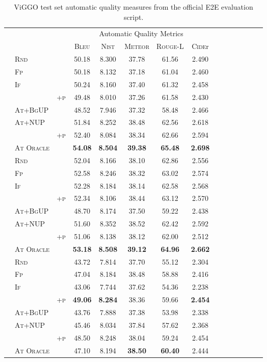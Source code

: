\begin{table*}
\begin{tabular}{lll c c c c  c c c c  c c c c}
 & & &  \multicolumn{5}{c}{Automatic Quality Metrics} \\
\cmidrule(lr){4-8} 
 & & &  \textsc{Bleu} &  \textsc{Nist} &  \textsc{Meteor} & \textsc{Rouge-L} & \textsc{Cide}r \\
\midrule
\parbox[t]{2mm}{}
&\textsc{Rnd} & &50.18&8.300&37.78&61.56&2.490 \\
&\textsc{Fp} & &50.18&8.132&37.18&61.04&2.460 \\
&\textsc{If} & &50.24&8.160&37.40&61.32&2.458 \\
&  & \textsc{+p}&49.48&8.010&37.26&61.58&2.430 \\
&\textsc{At+BgUP} & &48.52&7.946&37.32&58.48&2.466 \\
&\textsc{At+NUP} & &51.84&8.252&38.48&62.56&2.618 \\
&  & \textsc{+p}&52.40&8.084&38.34&62.66&2.594 \\
&\textsc{At Oracle} & &\textbf{54.08}&\textbf{8.504}&\textbf{39.38}&\textbf{65.48}&\textbf{2.698} \\
\midrule
\parbox[t]{2mm}{}
&\textsc{Rnd} & &52.04&8.166&38.10&62.86&2.556 \\
&\textsc{Fp} & &52.58&8.246&38.32&63.02&2.574 \\
&\textsc{If} & &52.28&8.184&38.14&62.58&2.568 \\
&  & \textsc{+p}&52.34&8.106&38.44&63.12&2.570 \\
&\textsc{At+BgUP} & &48.70&8.174&37.50&59.22&2.438 \\
&\textsc{At+NUP} & &51.60&8.352&38.52&62.42&2.592 \\
&  & \textsc{+p}&51.06&8.138&38.12&62.00&2.512 \\
&\textsc{At Oracle} & &\textbf{53.18}&\textbf{8.508}&\textbf{39.12}&\textbf{64.96}&\textbf{2.662} \\
\midrule
\parbox[t]{2mm}{}
&\textsc{Rnd} & &43.72&7.814&37.70&55.12&2.304 \\
&\textsc{Fp} & &47.04&8.184&38.48&58.88&2.416 \\
&\textsc{If} & &43.06&7.744&37.62&54.36&2.238 \\
&  & \textsc{+p}&\textbf{49.06}&\textbf{8.284}&38.36&59.66&\textbf{2.454} \\
&\textsc{At+BgUP} & &43.76&7.888&37.38&53.98&2.338 \\
&\textsc{At+NUP} & &45.46&8.034&37.84&57.62&2.368 \\
&  & \textsc{+p}&48.50&8.248&38.04&59.24&2.454 \\
&\textsc{At Oracle} & &47.10&8.194&\textbf{38.50}&\textbf{60.40}&2.444 \\
\midrule
\end{tabular}


\caption{ViGGO test set automatic quality measures from the official E2E evaluation script.}


\label{app:viggo.auto}
\end{table*}
